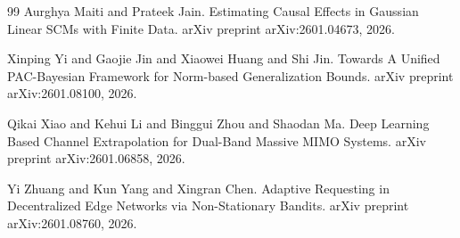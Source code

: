 \documentclass{article}
\begin{document}
\begin{thebibliography}{99}
Aurghya Maiti and Prateek Jain. Estimating Causal Effects in Gaussian Linear SCMs with Finite Data. arXiv preprint arXiv:2601.04673, 2026.

Xinping Yi and Gaojie Jin and Xiaowei Huang and Shi Jin. Towards A Unified PAC-Bayesian Framework for Norm-based Generalization Bounds. arXiv preprint arXiv:2601.08100, 2026.

Qikai Xiao and Kehui Li and Binggui Zhou and Shaodan Ma. Deep Learning Based Channel Extrapolation for Dual-Band Massive MIMO Systems. arXiv preprint arXiv:2601.06858, 2026.

Yi Zhuang and Kun Yang and Xingran Chen. Adaptive Requesting in Decentralized Edge Networks via Non-Stationary Bandits. arXiv preprint arXiv:2601.08760, 2026.
\end{thebibliography}
\end{document}
